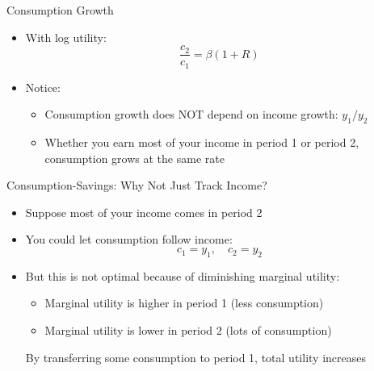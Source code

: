 \documentclass[10pt,aspectratio=169]{beamer}
\begin{document}
\begin{frame}{Consumption Growth}

\begin{itemize}
    \item With log utility:
    \[
    \frac{c_2}{c_1} = \beta (1+R)
    \]
    \vspace{0.3cm}
    
    \item Notice:
    \begin{itemize}
        \item Consumption growth does NOT depend on income growth: \(y_1/y_2\)
        \item Whether you earn most of your income in period 1 or period 2, consumption grows at the same rate
    \end{itemize}
    
\end{itemize}

\end{frame}

\begin{frame}{Consumption-Savings: Why Not Just Track Income?}

\begin{itemize}
    \item Suppose most of your income comes in period 2
    \vspace{0.2cm}
    
    \item You could let consumption follow income:
    \[
    c_1 = y_1, \quad c_2 = y_2
    \]
    
    \item But this is not optimal because of diminishing marginal utility:
    \begin{itemize}
        \item Marginal utility is higher in period 1 (less consumption)
        \item Marginal utility is lower in period 2 (lots of consumption)
    \end{itemize}
    
    \itemvso By transferring some consumption to period 1, total utility increases
\end{itemize}

\end{frame}
\end{document}
